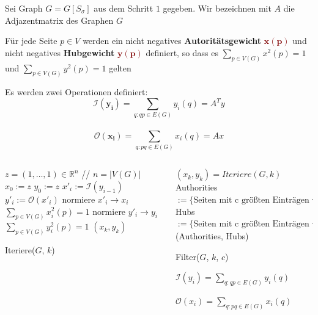 \documentclass[hyperref={pdfpagelabels=false}]{beamer}
\begin{document}
\begin{frame}
Sei Graph $G=G[S_\sigma]$ aus dem Schritt $1$ gegeben. Wir bezeichnen mit $A$ die Adjazentmatrix des Graphen $G$

\vspace{5pt}
Für jede Seite $p\in V$ werden ein nicht negatives {\bf Autoritätsgewicht} \textcolor{maroon}{$\mathbf{x(p)}$} und nicht negatives {\bf Hubgewicht} \textcolor{maroon}{$\mathbf{y(p)}$} definiert, so dass es $\sum_{p\in V(G)} x^2(p) = 1$ und $\sum_{p\in V(G)} y^2(p) = 1$ gelten
\vspace{10pt}

Es werden zwei Operationen definiert:\\
	$$\mathbf{\mathcal{I}(y_i)} = \sum_{q:qp\in E(G)}y_i(q) = A^Ty$$\\
	$$\mathbf{\mathcal{O}(x_i)} = \sum_{q:pq\in E(G)}x_i(q) = Ax$$

\end{frame}


\begin{frame}
\begin{minipage}[0.2\textheight]{\textwidth}
	\begin{columns}[T]
		\begin{column}{0.4\textwidth}

			\begin{algorithm}[H]
				\begin{algorithmic}[1]
				\STATE $z = (1,\dots,1)\in{\mathbb{R}^n}$ \hspace{30pt}// $n = |V(G)|$
				\STATE $x_0 := z$
				\STATE $y_0 := z$
					\STATE $x'_i:=\mathcal{I}(y_{i-1})$
					\STATE $y'_i:=\mathcal{O}(x'_{i})$
					\STATE normiere $x'_i \rightarrow x_i$
							$\sum_{p\in V(G)} x_i^2(p) = 1$
					\STATE normiere $y'_i \rightarrow y_i$
							$\sum_{p\in V(G)} y_i^2(p) = 1$
				\ENDFOR
				\RETURN $(x_k,y_k)$
				\end{algorithmic}
				\caption{Iteriere($G$, $k$)}
			\end{algorithm}
		\end{column}
		
	\begin{column}{0.6\textwidth}
		\begin{algorithm}[H]
			\begin{algorithmic}[1]
			
			\STATE $(x_k,y_k) = Iteriere(G,k)$
			\STATE Authorities $:= \{\text{Seiten mit c größten Einträgen von} x_k\}$ 
			\STATE Hubs $:= \{\text{Seiten mit c größten Einträgen von} y_k\}$ 
			\RETURN (Authorities, Hubs)
			\end{algorithmic}
		\caption{Filter($G$, $k$, $c$)}
		\end{algorithm}
		
		$\mathcal{I}(y_i) = \sum_{q:qp\in E(G)}y_i(q)$
		
		\vspace{10pt}
		
		$\mathcal{O}(x_i) = \sum_{q:pq\in E(G)}x_i(q)$

	\end{column}
	\end{columns}
\end{minipage}
\end{frame}
\end{document}
